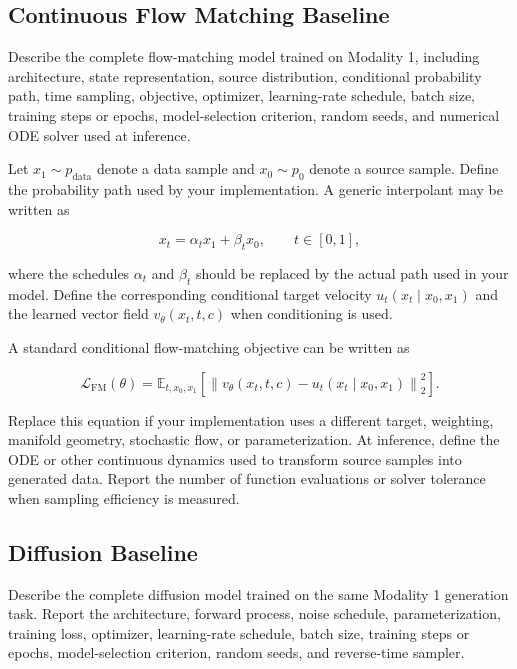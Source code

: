 \documentclass{article}
\begin{document}
\subsection{Continuous Flow Matching Baseline}

Describe the complete flow-matching model trained on Modality 1, including architecture, state representation, source distribution, conditional probability path, time sampling, objective, optimizer, learning-rate schedule, batch size, training steps or epochs, model-selection criterion, random seeds, and numerical ODE solver used at inference.

Let $x_1 \sim p_{\mathrm{data}}$ denote a data sample and $x_0 \sim p_0$ denote a source sample. Define the probability path used by your implementation. A generic interpolant may be written as

\begin{equation}
    x_t = \alpha_t x_1 + \beta_t x_0,
    \qquad t \in [0,1],
\end{equation}

where the schedules $\alpha_t$ and $\beta_t$ should be replaced by the actual path used in your model. Define the corresponding conditional target velocity $u_t(x_t \mid x_0,x_1)$ and the learned vector field $v_{\theta}(x_t,t,c)$ when conditioning is used.

A standard conditional flow-matching objective can be written as

\begin{equation}
\mathcal{L}_{\mathrm{FM}}(\theta)
=
\mathbb{E}_{t,x_0,x_1}
\left[
\left\|
 v_{\theta}(x_t,t,c)-u_t(x_t\mid x_0,x_1)
\right\|_2^2
\right].
\end{equation}

Replace this equation if your implementation uses a different target, weighting, manifold geometry, stochastic flow, or parameterization. At inference, define the ODE or other continuous dynamics used to transform source samples into generated data. Report the number of function evaluations or solver tolerance when sampling efficiency is measured.

\subsection{Diffusion Baseline}

Describe the complete diffusion model trained on the same Modality 1 generation task. Report the architecture, forward process, noise schedule, parameterization, training loss, optimizer, learning-rate schedule, batch size, training steps or epochs, model-selection criterion, random seeds, and reverse-time sampler.
\end{document}
